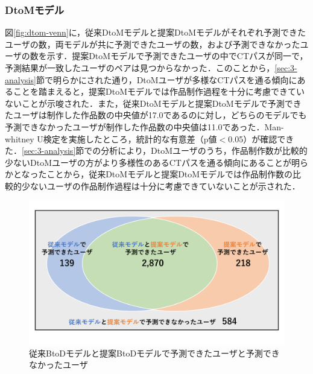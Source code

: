 \documentclass[submit,ses,noauthor]{ipsj}
\begin{document}
\subsubsection*{DtoMモデル}

図\ref{fig:dtom-venn}に，従来DtoMモデルと提案DtoMモデルがそれぞれ予測できたユーザの数，両モデルが共に予測できたユーザの数，および予測できなかったユーザの数を示す．提案DtoMモデルで予測できたユーザの中でCTパスが同一で，予測結果が一致したユーザのペアは見つからなかった．このことから，\ref{sec:3-analysis}節で明らかにされた通り，DtoMユーザが多様なCTパスを通る傾向にあることを踏まえると，提案DtoMモデルでは作品制作過程を十分に考慮できていないことが示唆された．また，従来DtoMモデルと提案DtoMモデルで予測できたユーザは制作した作品数の中央値が17.0であるのに対し，どちらのモデルでも予測できなかったユーザが制作した作品数の中央値は11.0であった．Man-whitney U検定を実施したところ，統計的な有意差（p値$<$0.05）が確認できた．\ref{sec:3-analysis}節での分析により，DtoMユーザのうち，作品制作数が比較的少ないDtoMユーザの方がより多様性のあるCTパスを通る傾向にあることが明らかとなったことから，従来DtoMモデルと提案DtoMモデルでは作品制作数の比較的少ないユーザの作品制作過程は十分に考慮できていないことが示された．

\begin{figure}[t]
	\centering
	\includegraphics[width=1.0\linewidth]{Okamoto_fig/btod-venn.pdf}
        \vspace{-15mm}
	\caption{従来BtoDモデルと提案BtoDモデルで予測できたユーザと予測できなかったユーザ}
	\label{fig:btod-venn}
\end{figure}
\end{document}
